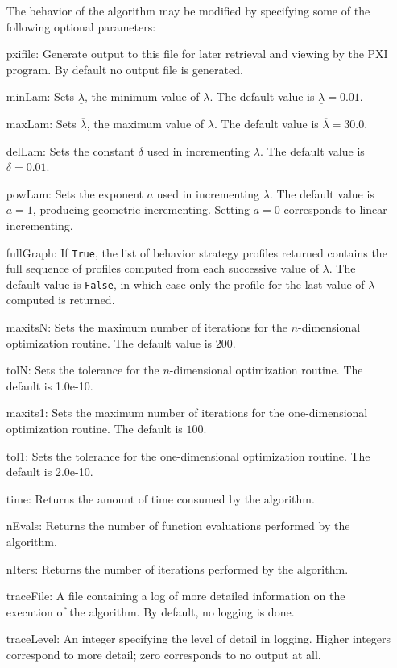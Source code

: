 \begin{itemize}
The behavior of the algorithm may be modified by specifying some of the
following optional parameters:
\bd
\item
[pxifile:] Generate output to this file for later retrieval and viewing by
the PXI program.  By default no output file is generated.
\item
[minLam:] Sets $\underline{\lambda}$, the minimum value of $\lambda$.  The 
default value is $\underline{\lambda}=0.01$.
\item
[maxLam:] Sets $\overline{\lambda}$, the maximum value of $\lambda$.  The
default value is $\overline{\lambda}=30.0$.
\item
[delLam:] Sets the constant $\delta$ used in incrementing $\lambda$.  The
default value is $\delta=0.01$.
\item
[powLam:] Sets the exponent $a$ used in incrementing $\lambda$.  The default
value is $a=1$, producing geometric incrementing.  Setting $a=0$ corresponds
to linear incrementing.
\item
[fullGraph:] If \verb+True+, the list of behavior strategy profiles
returned contains the full sequence of profiles computed from each successive
value of $\lambda$.  The default value is \verb+False+, in which case only
the profile for the last value of $\lambda$ computed is returned.
\item
[maxitsN:] Sets the maximum number of iterations for the $n$-dimensional
optimization routine.  The default value is $200$.
\item
[tolN:] Sets the tolerance for the $n$-dimensional optimization routine.
The default is 1.0e-10.
\item
[maxits1:] Sets the maximum number of iterations for the one-dimensional
optimization routine.  The default is $100$.
\item
[tol1:] Sets the tolerance for the one-dimensional optimization routine.
The default is 2.0e-10.
\item
[time:] Returns the amount of time consumed by the
algorithm.
\item
[nEvals:] Returns the number of function evaluations
performed by the algorithm.
\item
[nIters:] Returns the number of iterations performed
by the algorithm.
\item
[traceFile:] A file containing a log of more detailed information on
the execution of the algorithm.  By default, no logging is done.
\item
[traceLevel:] An integer specifying the level of detail in logging.
Higher integers correspond to more detail; zero corresponds to
no output at all.
\ed


\end{itemize}
